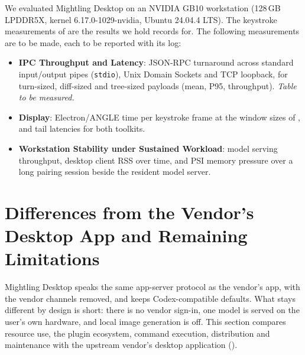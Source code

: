 \documentclass[11pt]{article}
\newcommand{\code}[1]{\texttt{#1}}
\begin{document}
We evaluated Mightling Desktop on an NVIDIA GB10 workstation (128\,GB LPDDR5X, kernel 6.17.0-1029-nvidia, Ubuntu 24.04.4 LTS).
The keystroke measurements of  are the results we hold records for. The following
measurements are to be made, each to be reported with its log:
\begin{itemize}
    \item \textbf{IPC Throughput and Latency}: JSON-RPC turnaround across standard input/output pipes (\code{stdio}),
    Unix Domain Sockets and TCP loopback, for turn-sized, diff-sized and tree-sized payloads (mean, P95, throughput).
    \textit{Table to be measured.}
    \item \textbf{Display}: Electron/ANGLE time per keystroke frame at the window sizes of ,
    and tail latencies for both toolkits.
    \item \textbf{Workstation Stability under Sustained Workload}: model serving throughput, desktop client RSS over time,
    and PSI memory pressure over a long pairing session beside the resident model server.
\end{itemize}

\section{Differences from the Vendor's Desktop App and Remaining Limitations}
\label{sec:limitations-tradeoffs}

Mightling Desktop speaks the same app-server protocol as the vendor's app, with the vendor channels
removed, and keeps Codex-compatible defaults. What stays different by design is short: there is no vendor sign-in,
one model is served on the user's own hardware, and local image generation is off. This section compares resource
use, the plugin ecosystem, command execution, distribution and maintenance with the upstream vendor's desktop
application ().
\end{document}
